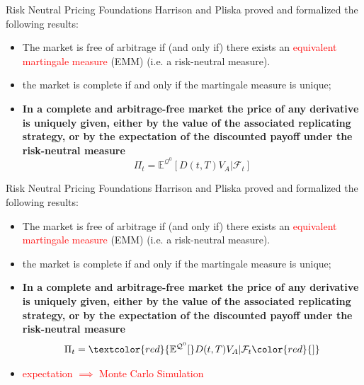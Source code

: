 \documentclass{beamer}
\begin{document}
\begin{frame}{Risk Neutral Pricing Foundations}
	Harrison and Pliska proved and formalized the following results:
	\begin{itemize}
		\item The market is free of arbitrage if (and only if) there exists an \textcolor{red}{equivalent martingale measure} (EMM) (i.e. a risk-neutral measure).
		\item the market is complete if and only if the martingale measure is unique;
		\item \textbf{In a complete and arbitrage-free market the price of any derivative is uniquely given, either by the value of the associated replicating strategy, or by the expectation of the discounted payoff under the risk-neutral measure}
		\begin{equation}
			\Pi_t = \mathbb{E}^{\mathcal{Q}^0}[D(t,T)V_A|\mathcal{F}_t]
			\label{eq:risk_neutral_pricing}
		\end{equation}
	\end{itemize}
\end{frame}

\begin{frame}{Risk Neutral Pricing Foundations}
	Harrison and Pliska proved and formalized the following results:
	\begin{itemize}
		\item The market is free of arbitrage if (and only if) there exists an \textcolor{red}{equivalent martingale measure} (EMM) (i.e. a risk-neutral measure).
		\item the market is complete if and only if the martingale measure is unique;
		\item \textbf{In a complete and arbitrage-free market the price of any derivative is uniquely given, either by the value of the associated replicating strategy, or by the expectation of the discounted payoff under the risk-neutral measure}
		\begin{equation*}
			\Pi_t = \textcolor{red}{\mathbb{E}^{\mathcal{Q}^0}[}D(t,T)V_A|\mathcal{F}_t\color{red}{]}
		\end{equation*}
		\item \small{\textcolor{red}{expectation $\implies$ Monte Carlo Simulation}}	
	\end{itemize}
\end{frame}
\end{document}
